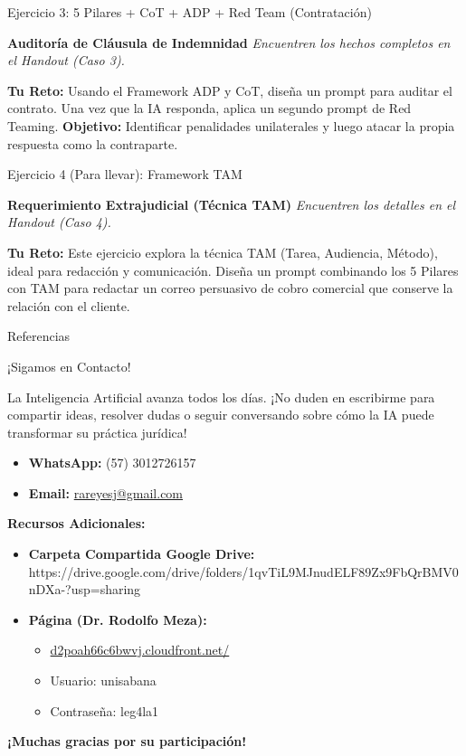 \documentclass[aspectratio=169]{beamer}
\begin{document}
\begin{frame}[fragile]{Ejercicio 3: 5 Pilares + CoT + ADP + Red Team (Contratación)}


\textbf{Auditoría de Cláusula de Indemnidad}
\textit{Encuentren los hechos completos en el Handout (Caso 3).}

\textbf{Tu Reto:} Usando el Framework ADP y CoT, diseña un prompt para auditar el contrato. Una vez que la IA responda, aplica un segundo prompt de Red Teaming.
\textbf{Objetivo:} Identificar penalidades unilaterales y luego atacar la propia respuesta como la contraparte.

\end{frame}



\begin{frame}[fragile]{Ejercicio 4 (Para llevar): Framework TAM}


\textbf{Requerimiento Extrajudicial (Técnica TAM)}
\textit{Encuentren los detalles en el Handout (Caso 4).}

\textbf{Tu Reto:} Este ejercicio explora la técnica TAM (Tarea, Audiencia, Método), ideal para redacción y comunicación.
Diseña un prompt combinando los 5 Pilares con TAM para redactar un correo persuasivo de cobro comercial que conserve la relación con el cliente.

\end{frame}



\begin{frame}[allowframebreaks]{Referencias}
  
  
\end{frame}

\begin{frame}[fragile]{¡Sigamos en Contacto!}


La Inteligencia Artificial avanza todos los días. ¡No duden en escribirme para compartir ideas, resolver dudas o seguir conversando sobre cómo la IA puede transformar su práctica jurídica!

\begin{itemize}
  \item \textbf{WhatsApp:} (57) 3012726157
  \item \textbf{Email:} \href{mailto:rareyesj@gmail.com}{rareyesj@gmail.com}
\end{itemize}
\textbf{Recursos Adicionales:}

\begin{itemize}
  \item \textbf{Carpeta Compartida Google Drive:} https://drive.google.com/drive/folders/1qvTiL9MJnudELF89Zx9FbQrBMV0nDXa-?usp=sharing
  \item \textbf{Página (Dr. Rodolfo Meza):}
  \begin{itemize}
    \item \href{https://d2poah66c6bwvj.cloudfront.net/legal-prompting/anatomia-prompt}{d2poah66c6bwvj.cloudfront.net/}
    \item Usuario: unisabana
    \item Contraseña: leg4la1
  \end{itemize}
\end{itemize}
\textbf{¡Muchas gracias por su participación!}
\end{frame}
\end{document}
